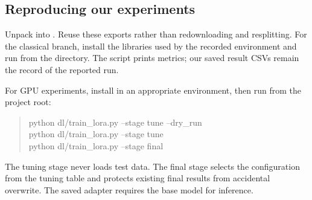 \subsection{Reproducing our experiments}
Unpack  into . Reuse these exports
rather than redownloading and resplitting. For the classical branch, install the
libraries used by the recorded environment and run  from
the  directory. The script prints metrics; our saved result CSVs
remain the record of the reported run.

For GPU experiments, install  in an appropriate
environment, then run from the project root:
\begin{quote}\ttfamily\small
python dl/train\_lora.py --stage tune --dry\_run\\
python dl/train\_lora.py --stage tune\\
python dl/train\_lora.py --stage final
\end{quote}
The tuning stage never loads test data. The final stage selects the configuration
from the tuning table and protects existing final results from accidental
overwrite. The saved adapter requires the base model for inference.

